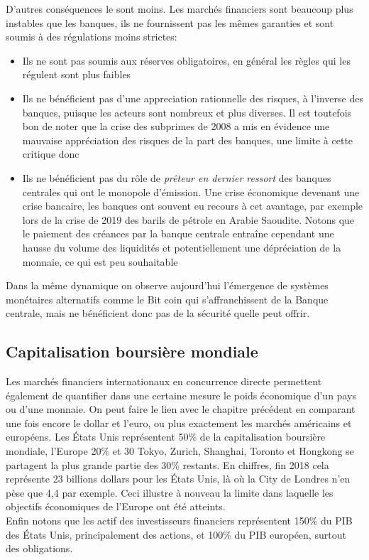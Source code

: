 \documentclass[main.tex]{subfiles}
\begin{document}
D'autres conséquences le sont moins. Les marchés financiers sont beaucoup plus instables que les banques, ils ne fournissent pas les mêmes garanties et sont soumis à des régulations moins strictes:
\begin{itemize}
        \item Ils ne sont pas soumis aux réserves obligatoires, en général les règles qui les régulent sont plus faibles
        \item Ils ne bénéficient pas d'une appreciation rationnelle des risques, à l'inverse des banques, puisque les acteurs sont nombreux et plus diverses. Il est toutefois bon de noter que la crise des subprimes de 2008 a mis en évidence une mauvaise appréciation des risques de la part des banques, une limite à cette critique donc
        \item Ils ne bénéficient pas du rôle de \emph{prêteur en dernier ressort} des banques centrales qui ont le monopole d'émission. Une crise économique devenant une crise bancaire, les banques ont souvent eu recours à cet avantage, par exemple lors de la crise de 2019 des barils de pétrole en Arabie Saoudite. Notons que le paiement des créances par la banque centrale entraîne cependant une hausse du volume des liquidités et potentiellement une dépréciation de la monnaie, ce qui est peu souhaitable
\end{itemize}


Dans la même dynamique on observe aujourd'hui l'émergence de systèmes monétaires alternatifs comme le Bit coin qui s'affranchissent de la Banque centrale, mais ne bénéficient donc pas de la sécurité quelle peut offrir.


\subsection{Capitalisation boursière mondiale}

Les marchés financiers internationaux en concurrence directe permettent également de quantifier dans une certaine mesure le poids économique d'un pays ou d'une monnaie. On peut faire le lien avec le chapitre précédent en comparant une fois encore le dollar et l'euro, ou plus exactement les marchés américains et européens. Les États Unis représentent 50\% de la capitalisation boursière mondiale, l'Europe 20\% et 30 Tokyo, Zurich, Shanghai, Toronto et Hongkong se partagent la plus grande partie des 30\% restants. En chiffres, fin 2018 cela représente 23 billions dollars pour les États Unis, là où la City de Londres n'en pèse que 4,4 par exemple. Ceci illustre à nouveau la limite dans laquelle les objectifs économiques de l'Europe ont été atteints. \\
Enfin notons que les actif des investisseurs financiers représentent 150\% du PIB des États Unis, principalement des actions, et 100\% du PIB européen, surtout des obligations.
\end{document}
